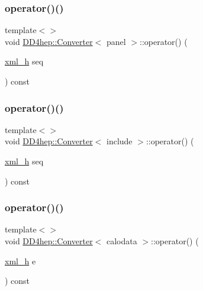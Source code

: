 \hypertarget{struct_d_d4hep_1_1_converter_a8fa2472b82ed6e63f467af231c336319}{}\label{struct_d_d4hep_1_1_converter_a8fa2472b82ed6e63f467af231c336319} 
\subsubsection{\texorpdfstring{operator()()}{operator()()}\hspace{0.1cm}{\footnotesize\ttfamily [5/22]}}
{\footnotesize\ttfamily template$<$$>$ \\
void \hyperlink{struct_d_d4hep_1_1_converter}{D\+D4hep\+::\+Converter}$<$ panel $>$\+::operator() (\begin{DoxyParamCaption}\item[{\hyperlink{_det_factory_helper_8h_ac13b3c79d2bc9214ff0cf5b8dc43dda6}{xml\+\_\+h}}]{seq }\end{DoxyParamCaption}) const}

\hypertarget{struct_d_d4hep_1_1_converter_abd59732927d299681cd2c6de56d6826b}{}\label{struct_d_d4hep_1_1_converter_abd59732927d299681cd2c6de56d6826b} 
\subsubsection{\texorpdfstring{operator()()}{operator()()}\hspace{0.1cm}{\footnotesize\ttfamily [6/22]}}
{\footnotesize\ttfamily template$<$$>$ \\
void \hyperlink{struct_d_d4hep_1_1_converter}{D\+D4hep\+::\+Converter}$<$ include $>$\+::operator() (\begin{DoxyParamCaption}\item[{\hyperlink{_det_factory_helper_8h_ac13b3c79d2bc9214ff0cf5b8dc43dda6}{xml\+\_\+h}}]{seq }\end{DoxyParamCaption}) const}

\hypertarget{struct_d_d4hep_1_1_converter_aab1dcc85772c092ce84d517566ee7f25}{}\label{struct_d_d4hep_1_1_converter_aab1dcc85772c092ce84d517566ee7f25} 
\subsubsection{\texorpdfstring{operator()()}{operator()()}\hspace{0.1cm}{\footnotesize\ttfamily [7/22]}}
{\footnotesize\ttfamily template$<$$>$ \\
void \hyperlink{struct_d_d4hep_1_1_converter}{D\+D4hep\+::\+Converter}$<$ calodata $>$\+::operator() (\begin{DoxyParamCaption}\item[{\hyperlink{_det_factory_helper_8h_ac13b3c79d2bc9214ff0cf5b8dc43dda6}{xml\+\_\+h}}]{e }\end{DoxyParamCaption}) const}

